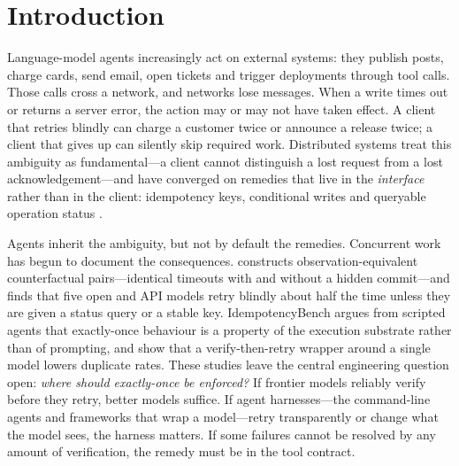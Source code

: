 \section{Introduction}
\label{sec:intro}

Language-model agents increasingly act on external systems: they publish posts, charge cards, send email,
open tickets and trigger deployments through tool calls. Those calls cross a network, and networks lose
messages. When a write times out or returns a server error, the action may or may not have taken effect.
A client that retries blindly can charge a customer twice or announce a release twice; a client that gives
up can silently skip required work. Distributed systems treat this ambiguity as fundamental---a client
cannot distinguish a lost request from a lost acknowledgement---and have converged on remedies that live in
the \emph{interface} rather than in the client: idempotency keys, conditional writes and queryable operation
status \citep{helland2012idempotence,stripe_idempotent,featonby2020retries}.

Agents inherit the ambiguity, but not by default the remedies. Concurrent work has begun to document the
consequences. \citet{sun2026didithappen} constructs observation-equivalent counterfactual pairs---identical
timeouts with and without a hidden commit---and finds that five open and API models retry blindly about half
the time unless they are given a status query or a stable key. IdempotencyBench
\citep{gopnalswamy2026idempotencybench} argues from scripted agents that exactly-once behaviour is a property
of the execution substrate rather than of prompting, and \citet{mansoor2026verified} show that a
verify-then-retry wrapper around a single model lowers duplicate rates. These studies leave the central
engineering question open: \emph{where should exactly-once be enforced?} If frontier models reliably verify
before they retry, better models suffice. If agent harnesses---the command-line agents and frameworks that
wrap a model---retry transparently or change what the model sees, the harness matters. If some failures cannot
be resolved by any amount of verification, the remedy must be in the tool contract.

